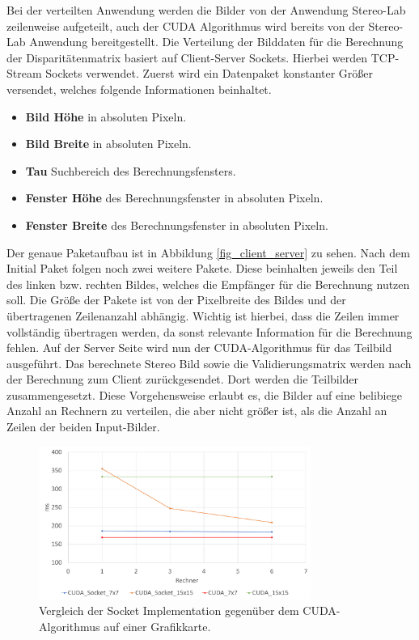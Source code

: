 \documentclass[conference]{IEEEtran}
\begin{document}
Bei der verteilten Anwendung werden die Bilder von der Anwendung Stereo-Lab zeilenweise aufgeteilt, auch der CUDA Algorithmus wird bereits von der Stereo-Lab Anwendung bereitgestellt. 
Die Verteilung der Bilddaten für die Berechnung der Disparitätenmatrix basiert auf Client-Server Sockets. 
Hierbei werden TCP-Stream Sockets verwendet.%
Zuerst wird ein Datenpaket konstanter Größer versendet, welches folgende Informationen beinhaltet.

\begin{itemize}
\item \textbf{Bild Höhe} in absoluten Pixeln.
\item \textbf{Bild Breite} in absoluten Pixeln.
\item \textbf{Tau} Suchbereich des Berechnungsfensters.
\item \textbf{Fenster Höhe} des Berechnungsfenster in absoluten Pixeln.
\item \textbf{Fenster Breite} des Berechnungsfenster in absoluten Pixeln.
\end{itemize}


Der genaue Paketaufbau ist in Abbildung \ref{fig_client_server} zu sehen. Nach dem Initial Paket folgen noch zwei weitere Pakete. Diese beinhalten jeweils den Teil des linken bzw. rechten Bildes, welches die Empfänger für die Berechnung nutzen soll. Die Größe der Pakete ist von der Pixelbreite des Bildes und der übertragenen Zeilenanzahl abhängig. Wichtig ist hierbei, dass die Zeilen immer vollständig übertragen werden, da sonst relevante Information für die Berechnung fehlen.%
Auf der Server Seite wird nun der CUDA-Algorithmus für das Teilbild ausgeführt. Das berechnete Stereo Bild sowie die Validierungsmatrix werden nach der Berechnung zum Client zurückgesendet. Dort werden die Teilbilder zusammengesetzt. Diese Vorgehensweise erlaubt es, die Bilder auf eine belibiege Anzahl an Rechnern zu verteilen, die aber nicht größer ist, als die Anzahl an Zeilen der beiden Input-Bilder. %


\begin{figure}[!t]
	\centering
	\includegraphics[width=3.5in]{SocketvsCUDA_bunt_3.pdf}
	\caption{Vergleich der Socket Implementation gegenüber dem CUDA-Algorithmus auf einer Grafikkarte.}
	\label{fig_socket_cuda}
\end{figure}
\end{document}
